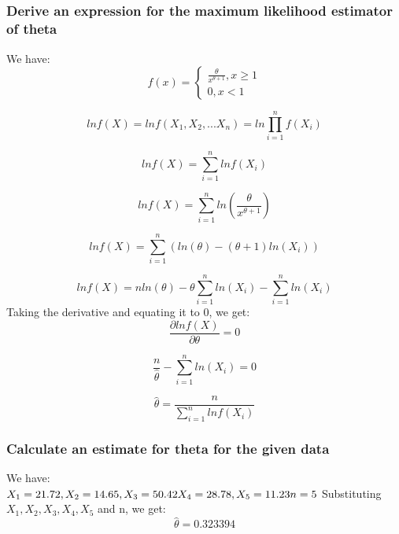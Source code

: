 \documentclass[12pt,letterpaper,titlepage,en-US]{article}
\begin{document}
\subsection{}
\subsubsection{Derive an expression for the maximum likelihood estimator of theta}
We have:
\begin{equation}
f(x) = \begin{cases}\frac{ \theta}{ x^{\theta+1}}, x\geq1
\\ 0, x<1 \end{cases}
\end{equation}




\begin{equation}
ln f(X) = ln f(X_{1}, X_{2},...X_{n})= ln \prod_{i=1}^{n}f(X_{i})
\end{equation}

\begin{equation}
ln f(X) =  \sum_{i=1}^{n} ln f(X_{i})
\end{equation}

\begin{equation}
ln f(X) = \sum_{i=1}^{n}ln(\frac{\theta}{x^{\theta+1}})
\end{equation}

\begin{equation}
ln f(X) = \sum_{i=1}^{n}(ln(\theta) - (\theta+1) ln(X_{i}))
\end{equation}

\begin{equation}
ln f(X) =nln(\theta) -  \theta\sum_{i=1}^{n}ln(X_{i})  - \sum_{i=1}^{n}ln(X_{i})
\end{equation}
Taking the derivative and equating it to 0, we get:
\begin{equation}
\frac{\partial ln f(X)}{\partial \theta} =0
\end{equation}

\begin{equation}
\frac{n}{\hat{ \theta}}-\sum_{i=1}^{n}ln(X_{i}) =0
\end{equation}

\begin{equation}
\hat{\theta}=\frac{n}{\sum_{i=1}^{n}lnf(X_{i})}
\end{equation}


\subsubsection{Calculate an estimate for theta for the given data}
We have:\\
$
X_{1}=21.72, X_{2}=14.65, X_{3}=50.42 \\
X_{4}=28.78, X_{5}=11.23\\
n=5\\
$
Substituting $X_{1},X_{2},X_{3},X_{4},X_{5}$ and n, we get:
\begin{equation}
\hat{\theta}=0.323394
\end{equation}
\end{document}

